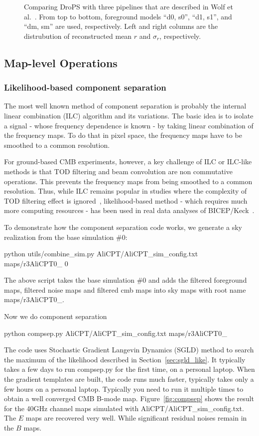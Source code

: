 \documentclass[12pt, a4paper]{ctexart} %
\def\tbox#1{\begin{tcolorbox}#1\end{tcolorbox}}
\begin{document}
\begin{figure}
  \caption{Comparing DroPS with three pipelines that are described in Wolf et al.~\cite{SO-SAT}. From top to bottom, foreground models ``d0, s0'', ``d1, s1'', and ``dm, sm'' are used, respectively. Left and right columns are the distrubution of reconstructed mean $r$ and $\sigma_r$, respectively.\label{fig:compare_SO}}
\end{figure}

\subsection{Map-level Operations}

\subsubsection{Likelihood-based component separation}

The most well known method of component separation is probably the internal linear combination (ILC) algorithm and its variations. The basic idea is to isolate a signal - whose frequency dependence is known - by taking linear combination of the frequency maps. To do that in pixel space, the frequency maps have to be smoothed to a common resolution. 

For ground-based CMB experiments, however, a key challenge of ILC or ILC-like methods is that TOD filtering and beam convolution are non commutative operations. This prevents the frequency maps from being smoothed to a common resolution. Thus, while ILC remains popular in studies where the complexity of TOD filtering effect is ignored~\cite{SO-SAT}, likelihood-based method - which requires much more computing resources - has been used in real data analyses of BICEP/Keck~\cite{BKmap}.

To demonstrate how the component separation code works, we generate a sky realization from the base simulation \#0:
\tbox{python utils/combine\_sim.py AliCPT/AliCPT\_sim\_config.txt maps/r3AliCPT0\_  0}
The above script takes the base simulation \#0 and adds the filtered foreground maps, filtered noise maps and filtered cmb maps into sky maps with root name maps/r3AliCPT0\_.

Now we do component separation
\tbox{python compsep.py AliCPT/AliCPT\_sim\_config.txt maps/r3AliCPT0\_}

The code uses Stochastic Gradient Langevin Dynamics (SGLD) method to search the maximum of the likelihood described in Section~\ref{sec:sgld_like}. It typically takes a few days to run compsep.py for the first time, on a personal laptop. When the gradient templates are built, the code runs much faster, typically takes only a few hours on a personal laptop. Typically you need to run it multiple times to obtain a well converged CMB B-mode map. Figure~\ref{fig:compsep} shows the result for the 40GHz channel maps simulated with AliCPT/AliCPT\_sim\_config.txt. The $E$ maps are recovered very well. While significant residual noises remain in the $B$ maps.
\end{document}
